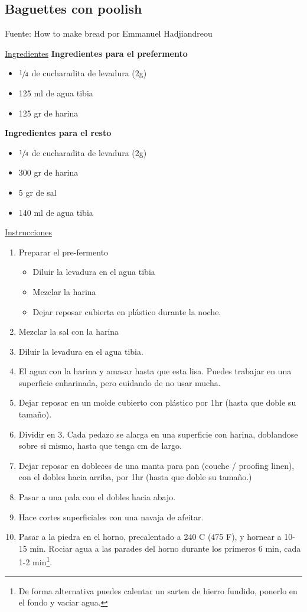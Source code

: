 \subsection{Baguettes con poolish}

Fuente: How to make bread por Emmanuel Hadjiandreou

\underline{Ingredientes}
\textbf{Ingredientes para el prefermento}
\begin{itemize}
\item $\sfrac{1}{4}$ de cucharadita de levadura (2g)
\item 125 ml de agua tibia
\item 125 gr de harina
\end{itemize}

\textbf{Ingredientes para el resto}
\begin{itemize}
\item $\sfrac{1}{4}$ de cucharadita de levadura (2g)
\item 300 gr de harina
\item 5 gr de sal
\item 140 ml de agua tibia
\end{itemize}

\underline{Instrucciones}
\begin{enumerate}
\item Preparar el pre-fermento
\begin{itemize}
\item Diluir la levadura en el agua tibia
\item Mezclar la harina
\item Dejar reposar cubierta en plástico durante la noche.
\end{itemize} 
\item Mezclar la sal con la harina
\item Diluir la levadura en el agua tibia.
\item El agua con la harina y amasar hasta que esta lisa. Puedes trabajar en una superficie enharinada, pero cuidando de no usar mucha.
\item Dejar reposar en un molde cubierto con plástico por \Sim 1hr (hasta que doble su tamaño).
\item Dividir en 3. Cada pedazo se alarga en una superficie con harina, doblandose sobre si mismo, hasta que tenga  cm de largo.
\item Dejar reposar en dobleces de una manta para pan (couche / proofing linen), con el dobles hacia arriba, por \Sim 1hr (hasta que doble su tamaño.)
\item Pasar a una pala con el dobles hacia abajo.
\item Hace cortes superficiales con una navaja de afeitar.
\item Pasar a la piedra en el horno, precalentado a 240 C (475 F), y hornear a 10-15 min. Rociar agua a las parades del horno durante los primeros 6 min, cada 1-2 min\footnote{De forma alternativa puedes calentar un sarten de hierro fundido, ponerlo en el fondo y vaciar agua.}.
\end{enumerate}

